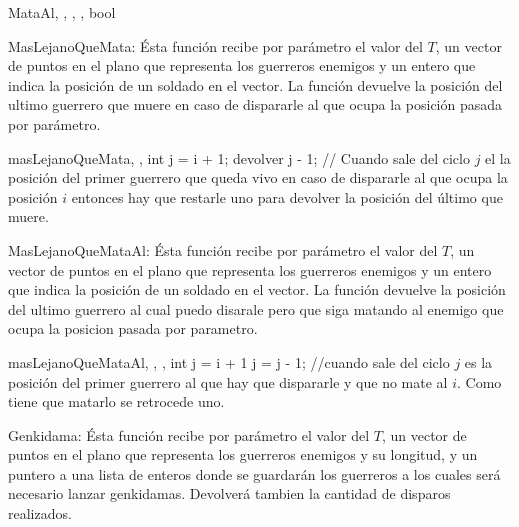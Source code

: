 		\begin{algoritmo}{MataAl}{, , , ,  }{bool}

		\end{algoritmo}
		
		MasLejanoQueMata:
		Ésta función recibe por parámetro el valor del $T$, un vector de puntos en el plano que representa los guerreros enemigos y un entero que indica la posición de un soldado en el vector.
		La función devuelve la posición del ultimo guerrero que muere en caso de dispararle al que ocupa la posición pasada por parámetro.\\

		\begin{algoritmo}{masLejanoQueMata}{, , }{int}
			j = i + 1;\;
  			devolver j - 1; // Cuando sale del ciclo $j$ el la posición del primer guerrero que queda vivo en caso de dispararle al que ocupa la posición $i$ entonces hay que restarle uno para devolver la posición del último que muere.\;
		\end{algoritmo}

		
		MasLejanoQueMataAl:
		Ésta función recibe por parámetro el valor del $T$,  un vector de puntos en el plano que representa los guerreros enemigos y un entero que indica la posición de un soldado en el vector.
		La función devuelve la posición del ultimo guerrero al cual puedo disarale pero que siga matando al enemigo que ocupa la posicion pasada por parametro.\\ 

	\begin{algoritmo}{masLejanoQueMataAl}{, , , }{int}
		j = i + 1 \;
  		j = j - 1;\; //cuando sale del ciclo $j$ es la posición del primer guerrero al que hay que dispararle y que no mate al $i$. Como tiene que matarlo se retrocede uno. 

	\end{algoritmo} \;

		
		Genkidama:
		Ésta función recibe por parámetro el valor del $T$,  un vector de puntos en el plano que representa los guerreros enemigos y su longitud, y un puntero a una lista de enteros donde se guardarán los guerreros a los cuales será necesario lanzar genkidamas. Devolverá tambien la cantidad de disparos realizados. \\

